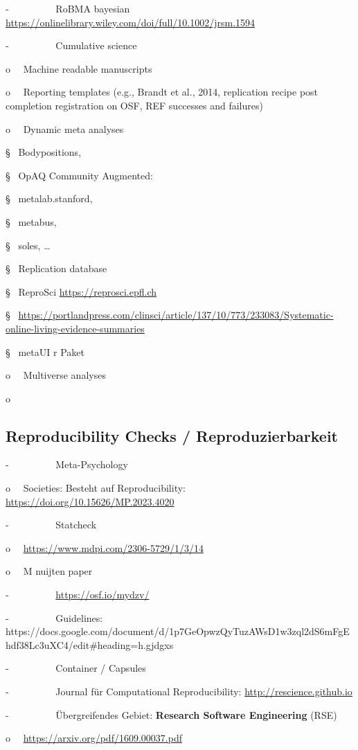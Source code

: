 \documentclass[
  letterpaper,
  DIV=11,
  numbers=noendperiod]{scrreprt}
\begin{document}
-~~~~~~~~~ RoBMA bayesian
\url{https://onlinelibrary.wiley.com/doi/full/10.1002/jrsm.1594}

-~~~~~~~~~ Cumulative science

o~~ Machine readable manuscripts

o~~ Reporting templates (e.g., Brandt et al., 2014, replication recipe
post completion registration on OSF, REF successes and failures)

o~~ Dynamic meta analyses

§~ Bodypositions,

§~ OpAQ Community Augmented:

§~ metalab.stanford,

§~ metabus,

§~ soles, \ldots{}

§~ Replication database

§~ ReproSci \url{https://reprosci.epfl.ch}

§~
\url{https://portlandpress.com/clinsci/article/137/10/773/233083/Systematic-online-living-evidence-summaries}

§~ metaUI r Paket

o~~ Multiverse analyses

o~~ ~

\subsection{Reproducibility Checks /
Reproduzierbarkeit}\label{reproducibility-checks-reproduzierbarkeit}

-~~~~~~~~~ Meta-Psychology

o~~ Societies: Besteht auf Reproducibility:
\url{https://doi.org/10.15626/MP.2023.4020}

-~~~~~~~~~ Statcheck

o~~ \url{https://www.mdpi.com/2306-5729/1/3/14}

o~~ M nuijten paper

-~~~~~~~~~ \url{https://osf.io/mydzv/}

-~~~~~~~~~ Guidelines:
https://docs.google.com/document/d/1p7GeOpwzQyTuzAWsD1w3zql2dS6mFgEhdf38Lc3uXC4/edit\#heading=h.gjdgxs

-~~~~~~~~~ Container / Capsules

-~~~~~~~~~ Journal für Computational Reproducibility:
\url{http://rescience.github.io}

-~~~~~~~~~ Übergreifendes Gebiet: \textbf{Research Software Engineering}
(RSE)

o~~ \url{https://arxiv.org/pdf/1609.00037.pdf}
\end{document}
